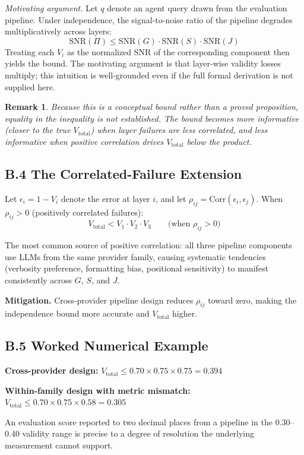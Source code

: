 \documentclass[preprint,12pt]{elsarticle}
\newtheorem{remark}{Remark}
\newcommand{\vtot}{V_{\text{total}}}
\newcommand{\cone}{V_1}
\newcommand{\ctwo}{V_2}
\newcommand{\cthree}{V_3}
\begin{document}
\textit{Motivating argument.} Let $q$ denote an agent query drawn from the evaluation
pipeline. Under independence, the signal-to-noise ratio of the pipeline degrades
multiplicatively across layers:
\[
  \mathrm{SNR}(\Pi) \leq \mathrm{SNR}(G) \cdot \mathrm{SNR}(S) \cdot \mathrm{SNR}(J)
\]
Treating each $V_i$ as the normalized SNR of the corresponding component then yields
the bound. The motivating argument is that layer-wise validity losses multiply; this
intuition is well-grounded even if the full formal derivation is not supplied here.

\begin{remark}
Because this is a conceptual bound rather than a proved proposition, equality in the
inequality is not established. The bound becomes more informative (closer to the true
$\vtot$) when layer failures are less correlated, and less informative when positive
correlation drives $\vtot$ below the product.
\end{remark}

\subsection*{B.4 The Correlated-Failure Extension}

Let $\epsilon_i = 1 - V_i$ denote the error at layer $i$, and let $\rho_{ij} =
\mathrm{Corr}(\epsilon_i, \epsilon_j)$. When $\rho_{ij} > 0$ (positively correlated
failures):
\[
  \vtot < \cone \cdot \ctwo \cdot \cthree \qquad \text{(when } \rho_{ij} > 0\text{)}
\]

The most common source of positive correlation: all three pipeline components use
LLMs from the same provider family, causing systematic tendencies (verbosity
preference, formatting bias, positional sensitivity) to manifest consistently across
$G$, $S$, and $J$.

\textbf{Mitigation.} Cross-provider pipeline design reduces $\rho_{ij}$ toward zero,
making the independence bound more accurate and $\vtot$ higher.

\subsection*{B.5 Worked Numerical Example}

\textbf{Cross-provider design:}
$\vtot \leq 0.70 \times 0.75 \times 0.75 = 0.394$

\textbf{Within-family design with metric mismatch:}
$\vtot \leq 0.70 \times 0.75 \times 0.58 = 0.305$

An evaluation score reported to two decimal places from a pipeline in the
0.30--0.40 validity range is precise to a degree of resolution the underlying
measurement cannot support.
\end{document}
